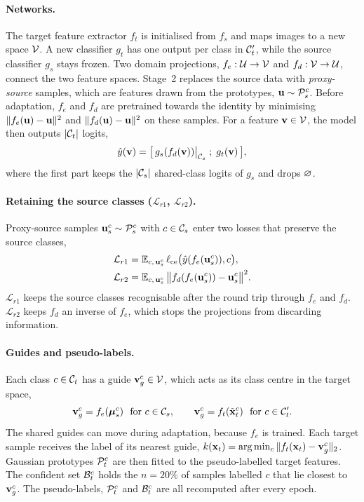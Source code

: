 \paragraph{Networks.}
The target feature extractor $f_t$ is initialised from $f_s$ and maps images to a new space $\mathcal{V}$.
A new classifier $g_t$ has one output per class in $\mathcal{C}'_t$, while the source classifier $g_s$ stays frozen.
Two domain projections, $f_e:\mathcal{U}\to\mathcal{V}$ and $f_d:\mathcal{V}\to\mathcal{U}$, connect the two feature spaces.
Stage~2 replaces the source data with \emph{proxy-source} samples, which are features drawn from the prototypes, $\mathbf{u}\sim\mathcal{P}_s^c$.
Before adaptation, $f_e$ and $f_d$ are pretrained towards the identity by minimising $\|f_e(\mathbf{u})-\mathbf{u}\|^2$ and $\|f_d(\mathbf{u})-\mathbf{u}\|^2$ on these samples.
For a feature $\mathbf{v}\in\mathcal{V}$, the model then outputs $|\mathcal{C}_t|$ logits,
\begin{equation}
  \hat{y}(\mathbf{v}) = \big[\,g_s(f_d(\mathbf{v}))\big|_{\mathcal{C}_s}\;;\; g_t(\mathbf{v})\,\big],
  \label{eq:yhat}
\end{equation}
where the first part keeps the $|\mathcal{C}_s|$ shared-class logits of $g_s$ and drops $\varnothing$.

\paragraph{Retaining the source classes ($\mathcal{L}_{r1}$, $\mathcal{L}_{r2}$).}
Proxy-source samples $\mathbf{u}_s^c\sim\mathcal{P}_s^c$ with $c\in\mathcal{C}_s$ enter two losses that preserve the source classes,
\begin{align}
  \mathcal{L}_{r1} &= \mathbb{E}_{c,\,\mathbf{u}_s^c}\,\ell_{\mathrm{ce}}\big(\hat{y}(f_e(\mathbf{u}_s^c)),c\big),\label{eq:lr1}\\
  \mathcal{L}_{r2} &= \mathbb{E}_{c,\,\mathbf{u}_s^c}\,\big\|f_d(f_e(\mathbf{u}_s^c))-\mathbf{u}_s^c\big\|^2.\label{eq:lr2}
\end{align}
$\mathcal{L}_{r1}$ keeps the source classes recognisable after the round trip through $f_e$ and $f_d$.
$\mathcal{L}_{r2}$ keeps $f_d$ an inverse of $f_e$, which stops the projections from discarding information.

\paragraph{Guides and pseudo-labels.}
Each class $c\in\mathcal{C}_t$ has a guide $\mathbf{v}_g^c\in\mathcal{V}$, which acts as its class centre in the target space,
\begin{equation}
  \mathbf{v}_g^c = f_e(\bm{\mu}_s^c)\ \ \text{for } c\in\mathcal{C}_s,
  \qquad
  \mathbf{v}_g^c = f_t(\tilde{\mathbf{x}}_t^c)\ \ \text{for } c\in\mathcal{C}'_t.
  \label{eq:guides}
\end{equation}
The shared guides can move during adaptation, because $f_e$ is trained.
Each target sample receives the label of its nearest guide, $k(\mathbf{x}_t)=\arg\min_{c}\|f_t(\mathbf{x}_t)-\mathbf{v}_g^c\|_2$.
Gaussian prototypes $\mathcal{P}_t^c$ are then fitted to the pseudo-labelled target features.
The confident set $\mathcal{B}_t^c$ holds the $n=20\%$ of samples labelled $c$ that lie closest to $\mathbf{v}_g^c$.
The pseudo-labels, $\mathcal{P}_t^c$ and $\mathcal{B}_t^c$ are all recomputed after every epoch.

